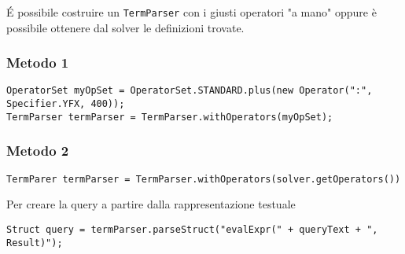 É possibile costruire un \texttt{TermParser} con i giusti operatori "a mano" oppure è possibile ottenere dal solver le definizioni trovate.

\subsubsection{Metodo 1}
\begin{verbatim}
OperatorSet myOpSet = OperatorSet.STANDARD.plus(new Operator(":", Specifier.YFX, 400));
TermParser termParser = TermParser.withOperators(myOpSet);
\end{verbatim}

\subsubsection{Metodo 2}

\begin{verbatim}
TermParer termParser = TermParser.withOperators(solver.getOperators())
\end{verbatim}

Per creare la query a partire dalla rappresentazione testuale
\begin{verbatim}
Struct query = termParser.parseStruct("evalExpr(" + queryText + ", Result)");
\end{verbatim}
















































